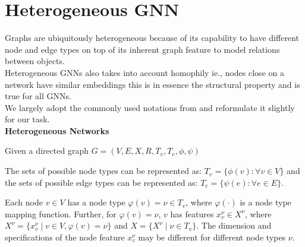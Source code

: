 \documentclass{report} %
\begin{document}
\section{Heterogeneous \ac{GNN}}\label{sec:Heterogeneous GNN}

Graphs are ubiquitously heterogeneous because of its capability to have different node and edge types on top of its inherent graph feature to model relations between objects.\\
Heterogeneous \ac{GNN}s also takes into account homophily ie., nodes close on a network have similar embeddings \cite{HGNN-2020} 
this is in essence the structural property and is true for all \ac{GNN}s.\\
We largely adopt the commonly used notations from \cite{ML HGNN-2023} and reformulate it slightly for our task. \\

\textbf{Heterogeneous Networks}

Given a directed graph \( G = (V, E, X, R, T_v, T_e, \phi, \psi) \)




The sets of possible node types can be represented as: \( T_v = \{ \phi(v) : \forall v \in V \} \) and the sets of possible edge types 
can be represented as: \( T_e = \{ \psi(e) : \forall e \in E \}.\) 

Each node \( v \in V \) has a node type \( \varphi(v) = \nu \in T_v \), where \( \varphi(\cdot) \) is a node type mapping function. 
Further, for \( \varphi(v) = \nu \), \( v \) has features \( x_v^{\nu} \in X^{\nu} \), 
where \( X^{\nu} = \{ x_v^{\nu} \mid v \in V, \varphi(v) = \nu \} \) and \( X = \{ X^{\nu} \mid \nu \in T_v \} \). 
The dimension and specifications of the node feature \( x_v^{\nu} \) may be different for different node types \( \nu \). 
\end{document}
